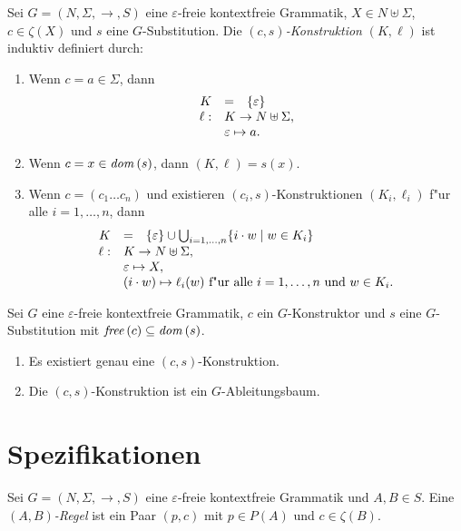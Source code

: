 \documentclass[12pt,a4paper]{article}
\begin{document}
\begin{definition}[Konstruktion]
  Sei $G = (N,\Sigma,\to,S)$ eine $\varepsilon$-freie kontextfreie Grammatik, $X \in N \uplus \Sigma$,
  $c \in \zeta(X)$ und $s$ eine $G$-Substitution. Die
  \emph{$(c,s)$-Konstruktion} $(K,\ell)$ ist induktiv definiert durch:
  \begin{enumerate}
  \item Wenn $c = a \in \Sigma$, dann
    \[\begin{array}{rcl}
      K &=& \{\varepsilon\} \\
      \ell: & \multicolumn{2}{l}{K \to N \uplus \Sigma,} \\
      & \multicolumn{2}{l}{\varepsilon \mapsto a.} \\
    \end{array}\]
  \item Wenn $c = x \in \mathit{dom}\,(s)$, dann $(K,\ell) = s(x)$.
  \item Wenn $c = (c_1 \ldots c_n)$ und existieren $(c_i,s)$-Konstruktionen $(K_i,\ell_i)$ f"ur alle
    $i=1,\ldots,n$, dann
    \[\begin{array}{rcl}
      K &=& \{\varepsilon\} \cup \bigcup_{i=1,\ldots,n} \{i \cdot w \mid w \in K_i\} \\
      \ell: & \multicolumn{2}{l}{K \to N \uplus \Sigma,} \\
      & \multicolumn{2}{l}{\varepsilon \mapsto X,} \\
      & \multicolumn{2}{l}{(i \cdot w) \mapsto \ell_i(w) \text{ f"ur alle $i=1,\ldots,n$ und $w \in K_i$.}}
    \end{array}\]
  \end{enumerate}
\end{definition}

\begin{lemma}
  Sei $G$ eine $\varepsilon$-freie kontextfreie Grammatik, $c$ ein $G$-Konstruktor und
  $s$ eine $G$-Substitution mit $\mathit{free}\,(c) \subseteq \mathit{dom}\,(s)$.
  \begin{enumerate}
  \item Es existiert genau eine $(c,s)$-Konstruktion.
  \item Die $(c,s)$-Konstruktion ist ein $G$-Ableitungsbaum.
  \end{enumerate}
\end{lemma}


\section{Spezifikationen}

\begin{definition}[Regeln]
  Sei $G=(N,\Sigma,\to,S)$ eine $\varepsilon$-freie kontextfreie Grammatik und $A,B \in S$. Eine
  \emph{$(A,B)$-Regel} ist ein Paar $(p,c)$ mit $p \in P(A)$ und $c \in \zeta(B)$. 
\end{definition}

\begin{definition}[Spezifikation]
  
\end{definition}
\end{document}
